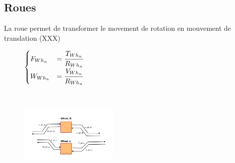 \subsection{Roues}
La roue permet de transformer le movement de rotation en mouvement de translation (XXX)
\vspace{-20px}
\begin{figure}[ht]
\centering
\begin{minipage}{.5\textwidth}  
\centering
$\begin{cases}
	F_{Wh_n} &= \cfrac{T_{Wh_n}}{R_{Wh_n}}  \\
	W_{Wh_n} &= \cfrac{V_{Wh_n}}{R_{Wh_n}}
\end{cases}$
\end{minipage}~
\begin{minipage}{.5\textwidth}
  \centering
\includegraphics[height=100px]{images/Wheel.png}
\end{minipage}
\end{figure}
\FloatBarrier
\vspace{-30px}

\newpage
